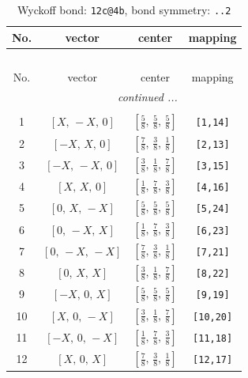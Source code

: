 \documentclass[fleqn,8pt]{jsarticle}
\begin{document}
\renewcommand{\arraystretch}{1.2}
\begin{longtable}{cccc}
\caption{Wyckoff bond: {\tt 12c@4b}, bond symmetry: {\tt ..2}}
 \\
 \hline \hline
No. & vector & center & mapping \\ \hline \endfirsthead

\multicolumn{3}{l}{\tablename\ \thetable{}} \\
 \hline \hline
No. & vector & center & mapping \\ \hline \endhead

 \hline \hline
\multicolumn{3}{r}{\footnotesize\it continued ...} \\ \endfoot

 \hline \hline
\multicolumn{3}{r}{} \\ \endlastfoot

1 & $\left[ X,\, - X,\, 0 \right]$ & $\left[ \frac{5}{8},\, \frac{5}{8},\, \frac{5}{8} \right]$ & {\tt [1,14]} \\ \hline
2 & $\left[ - X,\, X,\, 0 \right]$ & $\left[ \frac{7}{8},\, \frac{3}{8},\, \frac{1}{8} \right]$ & {\tt [2,13]} \\ \hline
3 & $\left[ - X,\, - X,\, 0 \right]$ & $\left[ \frac{3}{8},\, \frac{1}{8},\, \frac{7}{8} \right]$ & {\tt [3,15]} \\ \hline
4 & $\left[ X,\, X,\, 0 \right]$ & $\left[ \frac{1}{8},\, \frac{7}{8},\, \frac{3}{8} \right]$ & {\tt [4,16]} \\ \hline
5 & $\left[ 0,\, X,\, - X \right]$ & $\left[ \frac{5}{8},\, \frac{5}{8},\, \frac{5}{8} \right]$ & {\tt [5,24]} \\ \hline
6 & $\left[ 0,\, - X,\, X \right]$ & $\left[ \frac{1}{8},\, \frac{7}{8},\, \frac{3}{8} \right]$ & {\tt [6,23]} \\ \hline
7 & $\left[ 0,\, - X,\, - X \right]$ & $\left[ \frac{7}{8},\, \frac{3}{8},\, \frac{1}{8} \right]$ & {\tt [7,21]} \\ \hline
8 & $\left[ 0,\, X,\, X \right]$ & $\left[ \frac{3}{8},\, \frac{1}{8},\, \frac{7}{8} \right]$ & {\tt [8,22]} \\ \hline
9 & $\left[ - X,\, 0,\, X \right]$ & $\left[ \frac{5}{8},\, \frac{5}{8},\, \frac{5}{8} \right]$ & {\tt [9,19]} \\ \hline
10 & $\left[ X,\, 0,\, - X \right]$ & $\left[ \frac{3}{8},\, \frac{1}{8},\, \frac{7}{8} \right]$ & {\tt [10,20]} \\ \hline
11 & $\left[ - X,\, 0,\, - X \right]$ & $\left[ \frac{1}{8},\, \frac{7}{8},\, \frac{3}{8} \right]$ & {\tt [11,18]} \\ \hline
12 & $\left[ X,\, 0,\, X \right]$ & $\left[ \frac{7}{8},\, \frac{3}{8},\, \frac{1}{8} \right]$ & {\tt [12,17]} \\
\end{longtable}
\end{document}
